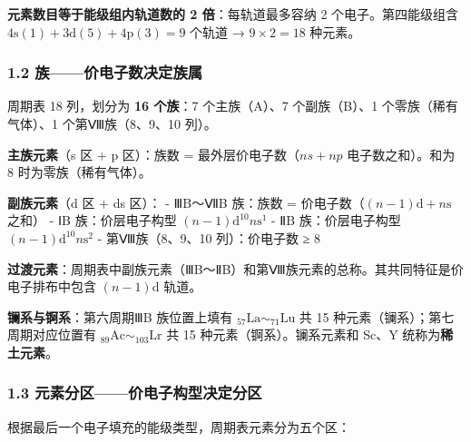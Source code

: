 \documentclass[a4paper,11pt]{ctexart}
\begin{document}
\textbf{元素数目等于能级组内轨道数的 2 倍}：每轨道最多容纳 2 个电子。第四能级组含 \(4\mathrm{s}(1)+3\mathrm{d}(5)+4\mathrm{p}(3)=9\) 个轨道 → \(9\times2=18\) 种元素。

\subsubsection{1.2 族------价电子数决定族属}\label{ux65cfux4ef7ux7535ux5b50ux6570ux51b3ux5b9aux65cfux5c5e}

周期表 18 列，划分为 \textbf{16 个族}：7 个主族（A）、7 个副族（B）、1 个零族（稀有气体）、1 个第Ⅷ族（8、9、10 列）。

\textbf{主族元素}（s 区 + p 区）：族数 = 最外层价电子数（\(ns + np\) 电子数之和）。和为 8 时为零族（稀有气体）。

\textbf{副族元素}（d 区 + ds 区）：
- ⅢB～ⅦB 族：族数 = 价电子数（\((n-1)\mathrm{d} + n\mathrm{s}\) 之和）
- ⅠB 族：价层电子构型 \((n-1)\mathrm{d}^{10}n\mathrm{s}^{1}\)
- ⅡB 族：价层电子构型 \((n-1)\mathrm{d}^{10}n\mathrm{s}^{2}\)
- 第Ⅷ族（8、9、10 列）：价电子数 ≥ 8

\textbf{过渡元素}：周期表中副族元素（ⅢB～ⅡB）和第Ⅷ族元素的总称。其共同特征是价电子排布中包含 \((n-1)\mathrm{d}\) 轨道。

\textbf{镧系与锕系}：第六周期ⅢB 族位置上填有 \(_{57}\mathrm{La}\sim _{71}\mathrm{Lu}\) 共 15 种元素（镧系）；第七周期对应位置有 \(_{89}\mathrm{Ac}\sim _{103}\mathrm{Lr}\) 共 15 种元素（锕系）。镧系元素和 Sc、Y 统称为\textbf{稀土元素}。

\subsubsection{1.3 元素分区------价电子构型决定分区}\label{ux5143ux7d20ux5206ux533aux4ef7ux7535ux5b50ux6784ux578bux51b3ux5b9aux5206ux533a}

根据最后一个电子填充的能级类型，周期表元素分为五个区：
\end{document}
